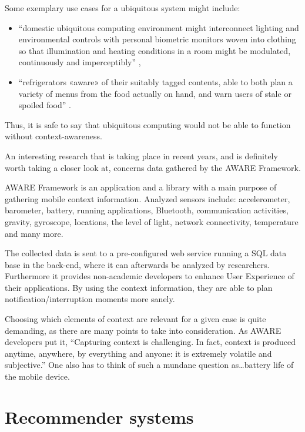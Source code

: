 Some exemplary use cases for a ubiquitous system might include:

\begin{itemize}
	\item ``domestic ubiquitous computing environment might interconnect lighting and environmental controls with personal biometric monitors woven into clothing so that illumination and heating conditions in a room might be modulated, continuously and imperceptibly'' \cite{wiki:ubiquitous},
	\item ``refrigerators «aware» of their suitably tagged contents, able to both plan a variety of menus from the food actually on hand, and warn users of stale or spoiled food'' \cite{wiki:ubiquitous}.
\end{itemize}

Thus, it is safe to say that ubiquitous computing would not be able to function without context-awareness.

An interesting research that is taking place in recent years, and is definitely worth taking a closer look at, concerns data gathered by the AWARE Framework.

AWARE Framework is an application and a library with a main purpose of gathering mobile context information. Analyzed sensors include: accelerometer, barometer, battery, running applications, Bluetooth, communication activities, gravity, gyroscope, locations, the level of light, network connectivity, temperature and many more. \cite{aware}

The collected data is sent to a pre-configured web service running a SQL data base in the back-end, where it can afterwards be analyzed by researchers. Furthermore it provides non-academic developers to enhance User Experience of their applications. By using the context information, they are able to plan notification/interruption moments more sanely. \cite{aware}

Choosing which elements of context are relevant for a given case is quite demanding, as there are many points to take into consideration. As AWARE developers put it, ``Capturing context is challenging. In fact, context is produced anytime, anywhere, by everything and anyone: it is extremely volatile and subjective.'' \cite{aware} One also has to think of such a mundane question as\ldots battery life of the mobile device.

\vspace{4cm}

\clearpage

\section{Recommender systems}